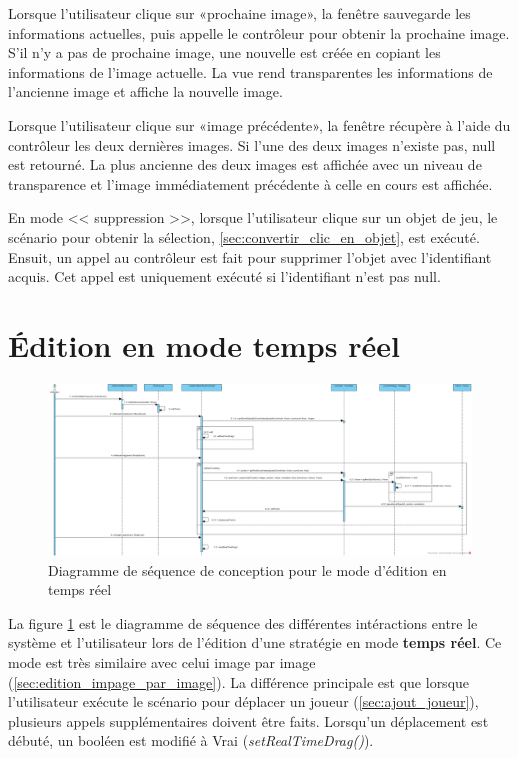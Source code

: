 Lorsque l'utilisateur clique sur «prochaine image», la fenêtre sauvegarde les informations actuelles, puis appelle le contrôleur pour obtenir la prochaine image.
S'il n'y a pas de prochaine image, une nouvelle est créée en copiant les informations de l'image actuelle.
La vue rend transparentes les informations de l'ancienne image et affiche la nouvelle image.

Lorsque l'utilisateur clique sur «image précédente», la fenêtre récupère à l'aide du contrôleur les deux dernières images.
Si l'une des deux images n'existe pas, null est retourné.
La plus ancienne des deux images est affichée avec un niveau de transparence et l'image immédiatement précédente à celle en cours est affichée.

En mode << suppression >>, lorsque l'utilisateur clique sur un objet de jeu, le scénario pour obtenir la sélection, \ref{sec:convertir_clic_en_objet}, est exécuté.
Ensuit, un appel au contrôleur est fait pour supprimer l'objet avec l'identifiant acquis.
Cet appel est uniquement exécuté si l'identifiant n'est pas null.

\section{Édition en mode temps réel}
\label{sec:edition_temps_reel}

\begin{figure}[htpb]
    \centering
    \includegraphics[scale=0.3]{fig/dsc_edition_temps_reel.png}
    \caption{Diagramme de séquence de conception pour le mode d'édition en temps réel}
    \label{fig:dsc_edit_real_time}
\end{figure}

La figure \ref{fig:dsc_edit_real_time} est le diagramme de séquence des différentes intéractions entre le système et l'utilisateur lors de l'édition d'une stratégie en mode \textbf{temps réel}.
Ce mode est très similaire avec celui image par image (\ref{sec:edition_impage_par_image}).
La différence principale est que lorsque l'utilisateur exécute le scénario pour déplacer un joueur (\ref{sec:ajout_joueur}), plusieurs appels supplémentaires doivent être faits.
Lorsqu'un déplacement est débuté, un booléen est modifié à Vrai (\textit{setRealTimeDrag()}).

